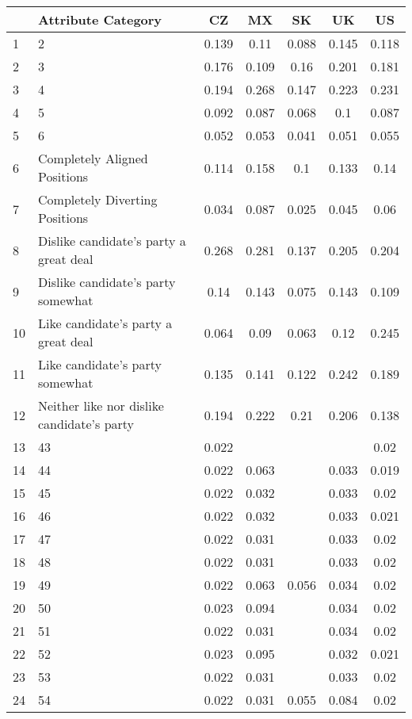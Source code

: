 \begin{longtable}{lp{7cm}ccccc}
  \toprule
 & Attribute Category & CZ & MX & SK & UK & US \\ 
  \midrule
1 & 2 & 0.139 & 0.11 & 0.088 & 0.145 & 0.118 \\ 
  2 & 3 & 0.176 & 0.109 & 0.16 & 0.201 & 0.181 \\ 
  3 & 4 & 0.194 & 0.268 & 0.147 & 0.223 & 0.231 \\ 
  4 & 5 & 0.092 & 0.087 & 0.068 & 0.1 & 0.087 \\ 
  5 & 6 & 0.052 & 0.053 & 0.041 & 0.051 & 0.055 \\ 
  6 & Completely Aligned Positions & 0.114 & 0.158 & 0.1 & 0.133 & 0.14 \\ 
  7 & Completely Diverting Positions & 0.034 & 0.087 & 0.025 & 0.045 & 0.06 \\ 
  8 & Dislike candidate's party a great deal & 0.268 & 0.281 & 0.137 & 0.205 & 0.204 \\ 
  9 & Dislike candidate's party somewhat & 0.14 & 0.143 & 0.075 & 0.143 & 0.109 \\ 
  10 & Like candidate's party a great deal & 0.064 & 0.09 & 0.063 & 0.12 & 0.245 \\ 
  11 & Like candidate's party somewhat & 0.135 & 0.141 & 0.122 & 0.242 & 0.189 \\ 
  12 & Neither like nor dislike candidate's party & 0.194 & 0.222 & 0.21 & 0.206 & 0.138 \\ 
  13 & 43 & 0.022 &  &  &  & 0.02 \\ 
  14 & 44 & 0.022 & 0.063 &  & 0.033 & 0.019 \\ 
  15 & 45 & 0.022 & 0.032 &  & 0.033 & 0.02 \\ 
  16 & 46 & 0.022 & 0.032 &  & 0.033 & 0.021 \\ 
  17 & 47 & 0.022 & 0.031 &  & 0.033 & 0.02 \\ 
  18 & 48 & 0.022 & 0.031 &  & 0.033 & 0.02 \\ 
  19 & 49 & 0.022 & 0.063 & 0.056 & 0.034 & 0.02 \\ 
  20 & 50 & 0.023 & 0.094 &  & 0.034 & 0.02 \\ 
  21 & 51 & 0.022 & 0.031 &  & 0.034 & 0.02 \\ 
  22 & 52 & 0.023 & 0.095 &  & 0.032 & 0.021 \\ 
  23 & 53 & 0.022 & 0.031 &  & 0.033 & 0.02 \\ 
  24 & 54 & 0.022 & 0.031 & 0.055 & 0.084 & 0.02 \\ 

\end{longtable}
